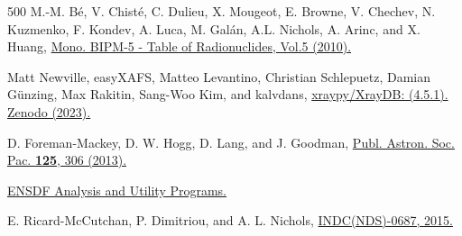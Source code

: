 \documentclass[aps,UTF8,prc,twocolumn,preprintnumbers,amsmath,amssymb,floatfix]{revtex4-2}
\begin{document}
\begin{thebibliography}{500}
M.-M. B\'e, V. Chist\'e, C. Dulieu, X. Mougeot, E. Browne, V. Chechev, N. Kuzmenko, F. Kondev, A. Luca, M. Gal\'an, A.L. Nichols, A. Arinc, and X. Huang, \href{http://www.bipm.org/utils/common/pdf/monographieRI/Monographie_BIPM-5_Tables_Vol5.pdf}{Mono. BIPM-5 - Table of Radionuclides, Vol.5 (2010).}

Matt Newville, easyXAFS, Matteo Levantino, Christian Schlepuetz, Damian G\"{u}nzing, Max Rakitin, Sang-Woo Kim, and kalvdans, \href{https://doi.org/10.5281/zenodo.8212749}{xraypy/XrayDB: (4.5.1). Zenodo (2023).}

D. Foreman-Mackey, D. W. Hogg, D. Lang, and J. Goodman, \href{https://doi.org/10.1086/670067}{Publ. Astron. Soc. Pac. \textbf{125}, 306 (2013).}

\href{https://www-nds.iaea.org/public/ensdf_pgm}{ENSDF Analysis and Utility Programs.}


E. Ricard-McCutchan, P. Dimitriou, and A. L. Nichols, \href{https://doi.org/10.61092/iaea.m9ef-nsbp}{INDC(NDS)-0687, 2015.}

\end{thebibliography}
\end{document}

